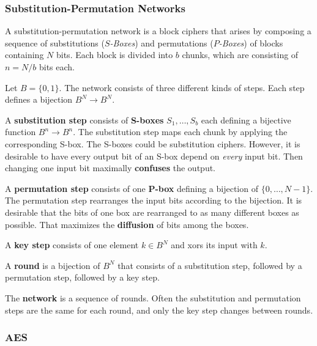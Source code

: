 \subsubsection{Substitution-Permutation Networks}

A substitution-permutation network is a block ciphers that arises by composing a sequence of substitutions (\emph{$S$-Boxes}) and permutations (\emph{$P$-Boxes}) of blocks containing $N$ bits.
Each block is divided into $b$ chunks, which are consisting of $n=N/b$ bits each.

Let $B=\{0,1\}$.
The network consists of three different kinds of steps.
Each step defines a bijection $B^N\to B^N$.

A \textbf{substitution step} consists of \textbf{S-boxes} $S_1,\ldots,S_b$ each defining a bijective function $B^n\to B^n$.
The substitution step maps each chunk by applying the corresponding S-box.
The S-boxes could be substitution ciphers.
However, it is desirable to have every output bit of an S-box depend on \emph{every} input bit.
Then changing one input bit maximally \textbf{confuses} the output.

A \textbf{permutation step} consists of one \textbf{P-box} defining a bijection of $\{0,\ldots,N-1\}$.
The permutation step rearranges the input bits according to the bijection.
It is desirable that the bits of one box are rearranged to as many different boxes as possible.
That maximizes the \textbf{diffusion} of bits among the boxes.

A \textbf{key step} consists of one element $k\in B^N$ and xors its input with $k$.

A \textbf{round} is a bijection of $B^N$ that consists of a substitution step, followed by a permutation step, followed by a key step.

The \textbf{network} is a sequence of rounds.
Often the substitution and permutation steps are the same for each round, and only the key step changes between rounds.


\subsubsection{AES}

